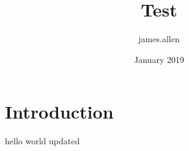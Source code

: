 \documentclass{article}
\title{Test}
\author{james.allen }
\date{January 2019}
\begin{document}
\maketitle

\section{Introduction}

hello world updated
\end{document}
